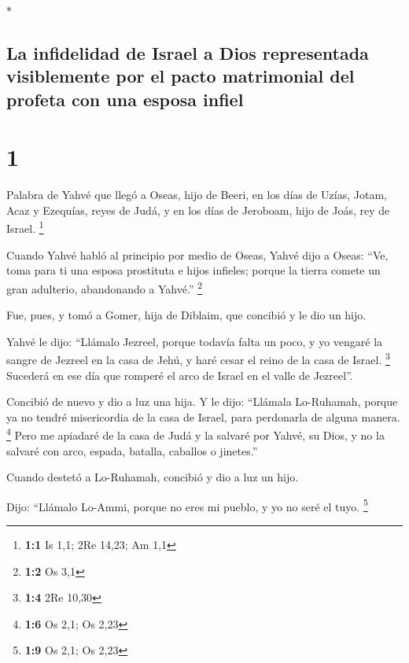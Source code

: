 \begin{paracol}{2} \switchcolumn[0]*

\hypertarget{la-infidelidad-de-israel-a-dios-representada-visiblemente-por-el-pacto-matrimonial-del-profeta-con-una-esposa-infiel}{%
\subsection{La infidelidad de Israel a Dios representada visiblemente
por el pacto matrimonial del profeta con una esposa
infiel}\label{la-infidelidad-de-israel-a-dios-representada-visiblemente-por-el-pacto-matrimonial-del-profeta-con-una-esposa-infiel}}

\hypertarget{section}{%
\section{1}\label{section}}

 Palabra de Yahvé que llegó a Oseas, hijo de Beeri, en los
días de Uzías, Jotam, Acaz y Ezequías, reyes de Judá, y en los días de
Jeroboam, hijo de Joás, rey de Israel. \footnote{\textbf{1:1} Is 1,1;
  2Re 14,23; Am 1,1}

 Cuando Yahvé habló al principio por medio de Oseas, Yahvé
dijo a Oseas: ``Ve, toma para ti una esposa prostituta e hijos infieles;
porque la tierra comete un gran adulterio, abandonando a Yahvé.''
\footnote{\textbf{1:2} Os 3,1}

 Fue, pues, y tomó a Gomer, hija de Diblaim, que concibió
y le dio un hijo.

 Yahvé le dijo: ``Llámalo Jezreel, porque todavía falta un
poco, y yo vengaré la sangre de Jezreel en la casa de Jehú, y haré cesar
el reino de la casa de Israel. \footnote{\textbf{1:4} 2Re 10,30}
 Sucederá en ese día que romperé el arco de Israel en el
valle de Jezreel''.

 Concibió de nuevo y dio a luz una hija. Y le dijo:
``Llámala Lo-Ruhamah, porque ya no tendré misericordia de la casa de
Israel, para perdonarla de alguna manera. \footnote{\textbf{1:6} Os 2,1;
  Os 2,23}  Pero me apiadaré de la casa de Judá y la
salvaré por Yahvé, su Dios, y no la salvaré con arco, espada, batalla,
caballos o jinetes.''

 Cuando destetó a Lo-Ruhamah, concibió y dio a luz un
hijo.

 Dijo: ``Llámalo Lo-Ammi, porque no eres mi pueblo, y yo
no seré el tuyo. \footnote{\textbf{1:9} Os 2,1; Os 2,23}


\end{paracol}
